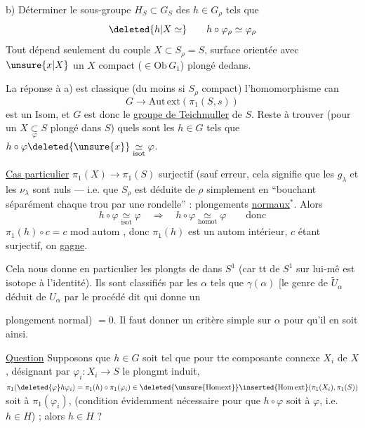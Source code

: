 b) Déterminer le sous-groupe $H_S\subset G_S$ des $h\in G_\rho$ tels que
\[
 \deleted{h|X\simeq}\qquad h\circ\varphi_\rho\simeq\varphi_\rho
\]
Tout dépend seulement du couple $X\subset S_\rho=S$,  surface orientée avec $\unsure{x|X}$  un $X$ compact ($\in\mathrm{Ob}\,G_1$) plongé dedans.

La réponse à a) est classique (du moins si $S_\rho$ compact)  l'homomorphisme can
\[
 G\longrightarrow\mathrm{Aut\,ext}(\pi_1(S,s))
\]
est un Isom, et $G$ est donc le \uline{groupe de Teichmuller} de  $S$. Reste à trouver (pour un $X\underset{\varphi}{\subset} S$ plongé dans $S$) quels sont les $h\in G$ tels que $h\circ\varphi\deleted{\unsure{x}}\underset{\mathrm{isot}}{\simeq}\varphi$.

\uline{Cas particulier}  $\pi_1(X)\longrightarrow\pi_1(S)$ surjectif (sauf erreur, cela signifie  que les $g_\lambda$ et les $\nu_\lambda$ sont nuls --- i.e. que $S_\rho$ est déduite de $\rho$ simplement en ``bouchant séparément chaque trou par une rondelle'' : plongements \uline{normaux}$^*$. Alors
\[
 h\circ\varphi\underset{\mathrm{isot}}{\simeq}\varphi\quad\Longrightarrow\quad
 h\circ\varphi\underset{\mathrm{homot}}{\simeq}\varphi\qquad\text{donc}
\]
$\pi_1(h)\circ c=c$ mod autom , donc $\pi_1(h)$ est un autom intérieur, $c$ étant surjectif, on \uline{gagne}.

Cela nous donne en particulier les plongts de  dans $S^1$ (car tt   de $S^1$ sur lui-mê est isotope à l'identité). Ils sont classifiés par les $\alpha$ tels que $\gamma(\alpha)$ [le genre de $\widetilde U_\alpha$ déduit de $U_\alpha$ par le procédé dit qui donne  un

plongement normal) $=0$. Il faut donner un critère simple sur $\alpha$ pour qu'il en soit ainsi.

\uline{Question} Supposons que $h\in G$ soit tel que pour tte composante connexe $X_i$ de $X$, désignant par $\varphi_i:X_i\longrightarrow S$ le plongmt induit, $\pi_1(\deleted{\varphi}h\varphi_i)=\pi_1(h)\circ\pi_1(\varphi_i)\in\deleted{\unsure{\mathrm{Homext}}}\inserted{\mathrm{Hom\,ext}}(\pi_1(X_i),\pi_1(S))$ soit  à $\pi_1(\varphi_i)$,  (condition évidemment nécessaire pour que  $h\circ\varphi$ soit  à $\varphi$,  i.e. $h\in H$) ; alors  $h\in H$ ?

